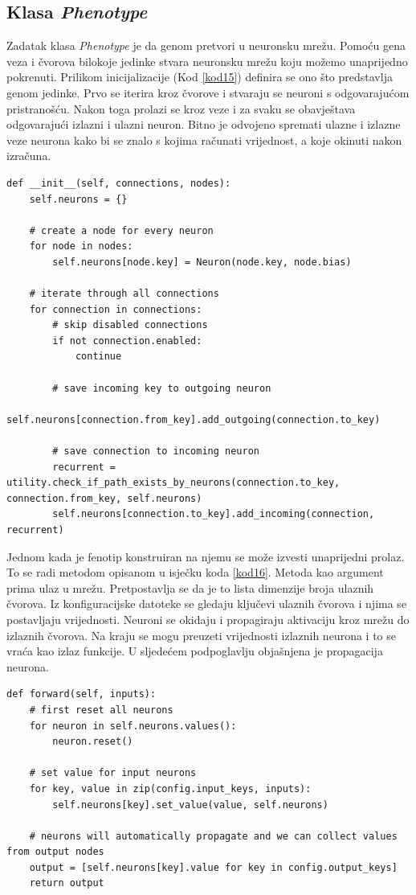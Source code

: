 \documentclass[times, utf8, diplomski, numeric]{fer}
\begin{document}
\subsection{Klasa \textit{Phenotype}}
Zadatak klasa \textit{Phenotype} je da genom pretvori u neuronsku mrežu. Pomoću gena veza i čvorova bilokoje jedinke stvara neuronsku mrežu koju možemo unaprijedno pokrenuti. Prilikom inicijalizacije (Kod \ref{kod15}) definira se ono što predstavlja genom jedinke. Prvo se iterira kroz čvorove i stvaraju se neuroni s odgovarajućom pristranošću. Nakon toga prolazi se kroz veze i za svaku se obavještava odgovarajući izlazni i ulazni neuron. Bitno je odvojeno spremati ulazne i izlazne veze neurona kako bi se znalo s kojima računati vrijednost, a koje okinuti nakon izračuna.

\begin{lstlisting}[frame=single, label=kod15, caption=Izvorni tekst metode \textit{\_\_init\_\_} u klasi \textit{Phenotype}]
def __init__(self, connections, nodes):
	self.neurons = {}

	# create a node for every neuron
	for node in nodes:
		self.neurons[node.key] = Neuron(node.key, node.bias)

	# iterate through all connections
	for connection in connections:
		# skip disabled connections
		if not connection.enabled:
			continue

		# save incoming key to outgoing neuron
		self.neurons[connection.from_key].add_outgoing(connection.to_key)

		# save connection to incoming neuron
		recurrent = utility.check_if_path_exists_by_neurons(connection.to_key, connection.from_key, self.neurons)
		self.neurons[connection.to_key].add_incoming(connection, recurrent)
\end{lstlisting}

Jednom kada je fenotip konstruiran na njemu se može izvesti unaprijedni prolaz. To se radi metodom opisanom u isječku koda \ref{kod16}. Metoda kao argument prima ulaz u mrežu. Pretpostavlja se da je to lista dimenzije broja ulaznih čvorova. Iz konfiguracijske datoteke se gledaju ključevi ulaznih čvorova i njima se postavljaju vrijednosti. Neuroni se okidaju i propagiraju aktivaciju kroz mrežu do izlaznih čvorova. Na kraju se mogu preuzeti vrijednosti izlaznih neurona i to se vraća kao izlaz funkcije. U sljedećem podpoglavlju objašnjena je propagacija neurona.

\begin{lstlisting}[frame=single, label=kod16, caption=Izvorni tekst metode \textit{forward} u klasi \textit{Phenotype}]
def forward(self, inputs):
	# first reset all neurons
	for neuron in self.neurons.values():
		neuron.reset()

	# set value for input neurons
	for key, value in zip(config.input_keys, inputs):
		self.neurons[key].set_value(value, self.neurons)

	# neurons will automatically propagate and we can collect values from output nodes
	output = [self.neurons[key].value for key in config.output_keys]
	return output
\end{lstlisting}
\end{document}
